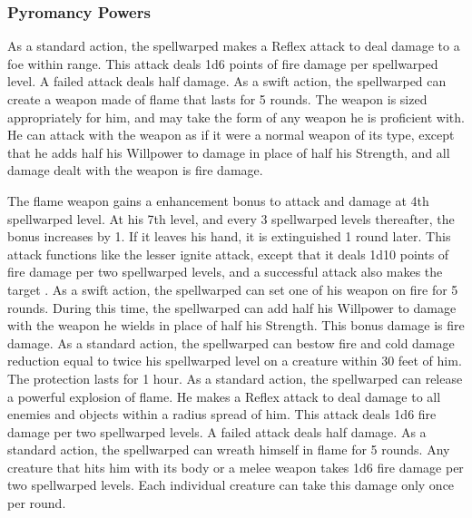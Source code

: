 \subsubsection{Pyromancy Powers}
As a standard action, the spellwarped makes a Reflex attack to deal damage to a foe within \rngclose range.
This attack deals 1d6 points of fire damage  per spellwarped level.
A failed attack deals half damage.
As a swift action, the spellwarped can create a weapon made of flame that lasts for 5 rounds.
The weapon is sized appropriately for him, and may take the form of any weapon he is proficient with.
He can attack with the weapon as if it were a normal weapon of its type, except that he adds half his Willpower to damage in place of half his Strength, and all damage dealt with the weapon is fire damage.
\par The flame weapon gains a  enhancement bonus to attack and damage at 4th spellwarped level.
At his 7th level, and every 3 spellwarped levels thereafter, the bonus increases by 1.
If it leaves his hand, it is extinguished 1 round later.
This attack functions like the lesser ignite attack, except that it deals 1d10 points of fire damage per two spellwarped levels, and a successful attack also makes the target \ignited.
As a swift action, the spellwarped can set one of his weapon on fire for 5 rounds.
During this time, the spellwarped can add half his Willpower to damage with the weapon he wields in place of half his Strength.
This bonus damage is fire damage.
As a standard action, the spellwarped can bestow fire and cold damage reduction equal to twice his spellwarped level on a creature within 30 feet of him.
The protection lasts for 1 hour.
As a standard action, the spellwarped can release a powerful explosion of flame.
He makes a Reflex attack to deal damage to all enemies and objects within a \areamed radius spread of him.
This attack deals 1d6 fire damage per two spellwarped levels.
A failed attack deals half damage.
As a standard action, the spellwarped can wreath himself in flame for 5 rounds.
Any creature that hits him with its body or a melee weapon takes 1d6 fire damage per two spellwarped levels.
Each individual creature can take this damage only once per round.

